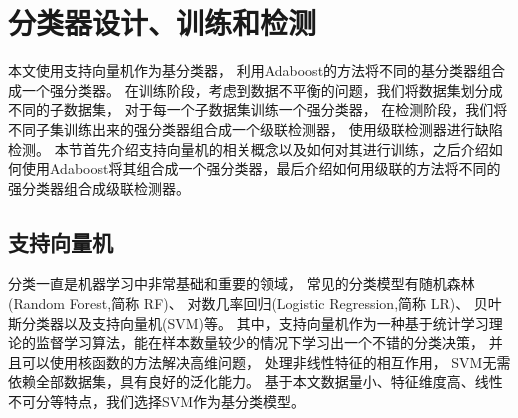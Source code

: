 \section{分类器设计、训练和检测}


本文使用支持向量机作为基分类器，
利用Adaboost的方法将不同的基分类器组合成一个强分类器。
在训练阶段，考虑到数据不平衡的问题，我们将数据集划分成不同的子数据集，
对于每一个子数据集训练一个强分类器，
在检测阶段，我们将不同子集训练出来的强分类器组合成一个级联检测器，
使用级联检测器进行缺陷检测。
本节首先介绍支持向量机的相关概念以及如何对其进行训练，之后介绍如何使用Adaboost将其组合成一个强分类器，最后介绍如何用级联的方法将不同的强分类器组合成级联检测器。

\subsection{支持向量机}
\label{subsection:svm}

分类一直是机器学习中非常基础和重要的领域，
常见的分类模型有随机森林\cite{breiman2001random}(Random Forest,简称 RF)、
对数几率回归\cite{周志华2016机器学习}(Logistic Regression,简称 LR)、
贝叶斯分类器以及支持向量机(SVM)等。
其中，支持向量机作为一种基于统计学习理论的监督学习算法，能在样本数量较少的情况下学习出一个不错的分类决策，
并且可以使用核函数的方法解决高维问题，
处理非线性特征的相互作用，
SVM无需依赖全部数据集，具有良好的泛化能力。
基于本文数据量小、特征维度高、线性不可分等特点，我们选择SVM作为基分类模型。


